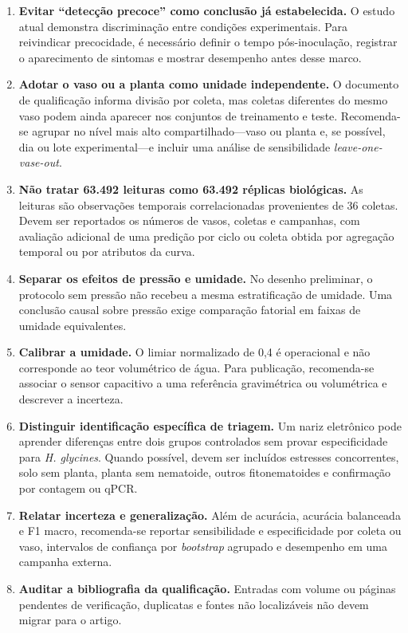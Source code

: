 \documentclass[12pt,a4paper]{article}
\begin{document}
\begin{enumerate}
    \item \textbf{Evitar ``detecção precoce'' como conclusão já estabelecida.} O estudo atual demonstra discriminação entre condições experimentais. Para reivindicar precocidade, é necessário definir o tempo pós-inoculação, registrar o aparecimento de sintomas e mostrar desempenho antes desse marco.

    \item \textbf{Adotar o vaso ou a planta como unidade independente.} O documento de qualificação informa divisão por coleta, mas coletas diferentes do mesmo vaso podem ainda aparecer nos conjuntos de treinamento e teste. Recomenda-se agrupar no nível mais alto compartilhado---vaso ou planta e, se possível, dia ou lote experimental---e incluir uma análise de sensibilidade \textit{leave-one-vase-out}.

    \item \textbf{Não tratar 63.492 leituras como 63.492 réplicas biológicas.} As leituras são observações temporais correlacionadas provenientes de 36 coletas. Devem ser reportados os números de vasos, coletas e campanhas, com avaliação adicional de uma predição por ciclo ou coleta obtida por agregação temporal ou por atributos da curva.

    \item \textbf{Separar os efeitos de pressão e umidade.} No desenho preliminar, o protocolo sem pressão não recebeu a mesma estratificação de umidade. Uma conclusão causal sobre pressão exige comparação fatorial em faixas de umidade equivalentes.

    \item \textbf{Calibrar a umidade.} O limiar normalizado de 0,4 é operacional e não corresponde ao teor volumétrico de água. Para publicação, recomenda-se associar o sensor capacitivo a uma referência gravimétrica ou volumétrica e descrever a incerteza.

    \item \textbf{Distinguir identificação específica de triagem.} Um nariz eletrônico pode aprender diferenças entre dois grupos controlados sem provar especificidade para \textit{H. glycines}. Quando possível, devem ser incluídos estresses concorrentes, solo sem planta, planta sem nematoide, outros fitonematoides e confirmação por contagem ou qPCR.

    \item \textbf{Relatar incerteza e generalização.} Além de acurácia, acurácia balanceada e F1 macro, recomenda-se reportar sensibilidade e especificidade por coleta ou vaso, intervalos de confiança por \textit{bootstrap} agrupado e desempenho em uma campanha externa.

    \item \textbf{Auditar a bibliografia da qualificação.} Entradas com volume ou páginas pendentes de verificação, duplicatas e fontes não localizáveis não devem migrar para o artigo.
\end{enumerate}



\end{document}
